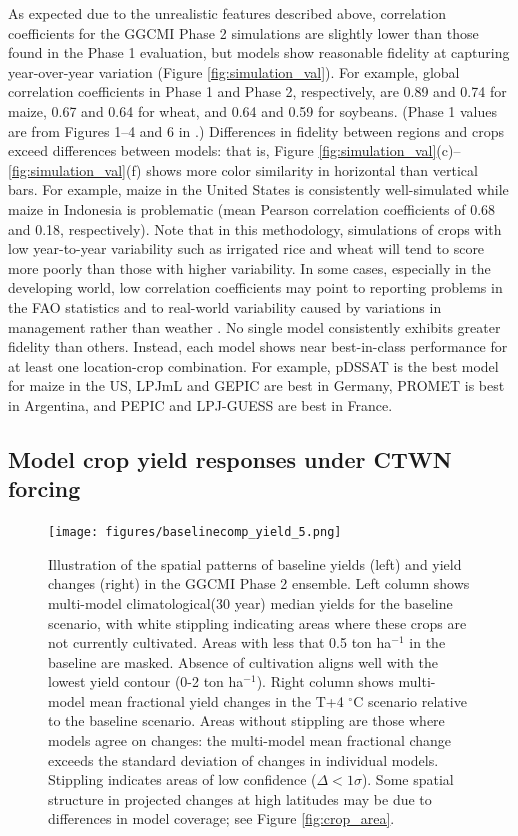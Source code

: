 \documentclass[gmd, manuscript]{copernicus} %
\begin{document}
As expected due to the unrealistic features described above, correlation coefficients for the GGCMI Phase 2 simulations are slightly lower than those found in the Phase 1 evaluation, but models show reasonable fidelity at capturing year-over-year variation (Figure \ref{fig:simulation_val}). 
For example, global correlation coefficients in Phase 1 and Phase 2, respectively, are 0.89 and 0.74 for maize, 0.67 and 0.64 for wheat, and 0.64 and 0.59 for soybeans.
(Phase 1 values are from Figures 1--4 and 6 in \citet{muller_global_2017}.)  
Differences in fidelity between regions and crops exceed differences between models: that is, Figure \ref{fig:simulation_val}(c)--\ref{fig:simulation_val}(f) shows more color similarity in horizontal than vertical bars. 
For example, maize in the United States is consistently well-simulated while maize in Indonesia is problematic (mean Pearson correlation coefficients of 0.68 and 0.18, respectively). 
Note that in this methodology, simulations of crops with low year-to-year variability such as irrigated rice and wheat will tend to score more poorly than those with higher variability.
In some cases, especially in the developing world, low correlation coefficients may point to reporting problems in the FAO statistics and to real-world variability caused by variations in management rather than weather \citep{Ray2012, muller_global_2017}. 
No single model consistently exhibits greater fidelity than others. 
Instead, each model shows near best-in-class performance for at least one location-crop combination. 
For example, pDSSAT is the best model for maize in the US, LPJmL and GEPIC are best in Germany, PROMET is best in Argentina, and PEPIC and LPJ-GUESS are best in France.

\subsection{Model crop yield responses under CTWN forcing}
\begin{figure}[ht]
\centering
  \texttt{[image: figures/baselinecomp\_yield\_5.png]} 
  \caption{
  Illustration of the spatial patterns of baseline yields (left) and yield changes (right) in the GGCMI Phase 2 ensemble. 
  Left column shows multi-model climatological(30 year) median yields for the baseline scenario, with white stippling indicating areas where these crops are not currently cultivated. 
  Areas with less that 0.5 ton ha$^{-1}$ in the baseline are masked.
  Absence of cultivation aligns well with the lowest yield contour (0-2 ton ha$^{-1}$). 
  Right column shows multi-model mean fractional yield changes in the T+4 $^{\circ}$C scenario relative to the baseline scenario. 
  Areas without stippling are those where models agree on changes: the multi-model mean fractional change exceeds the standard deviation of changes in individual models. 
  Stippling indicates areas of low confidence ($\Delta < 1 \sigma$). 
  Some spatial structure in projected changes at high latitudes may be due to differences in model coverage; see Figure \ref{fig:crop_area}.
  }
  \label{fig:maizesoybaseline}
\end{figure}
\end{document}
